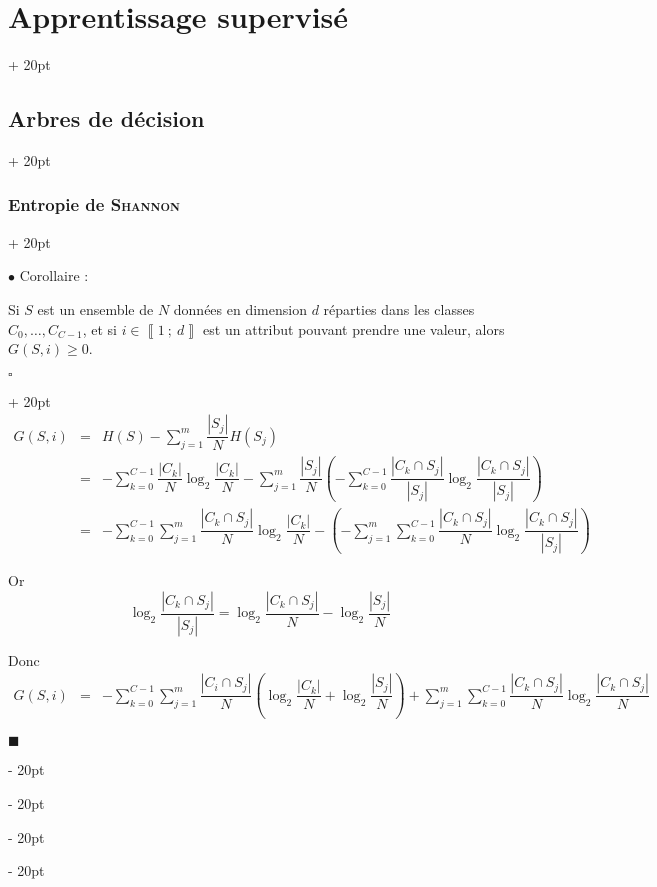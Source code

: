 \documentclass[a4paper, 12pt, twoside]{article}
\newcommand{\nset}[2]{\left\llbracket #1\ ;\ #2 \right\rrbracket}
\newcommand{\lr}[1]{\left( #1 \right)}
\newcommand{\abs}[1]{\left\lvert #1 \right\rvert}
\renewcommand{\ge}{\geqslant}
\newcommand{\ind}[1][20pt]{\advance\leftskip + #1}
\newcommand{\deind}[1][20pt]{\advance\leftskip - #1}
\newenvironment{indt}[2][20pt]{#2 \par \ind[#1]}{\par \deind} %
\newenvironment{proof}[1][{}]{\begin{indt}{$\square$ #1}}{$\blacksquare$ \end{indt}}
\begin{document}
\begin{indt}{\section{Apprentissage supervisé}}
\begin{indt}{\subsection{Arbres de décision}}
\begin{indt}{\subsubsection{Entropie de \textsc{Shannon}}}
                \vspace{12pt}
                
                $\bullet$ Corollaire :
                \begin{emphBox}
                    Si $S$ est un ensemble de $N$ données en dimension $d$ réparties dans les classes $C_0, \ldots, C_{C - 1}$, et si $i \in \nset 1 d$ est un attribut pouvant prendre une valeur, alors $G(S, i) \ge 0$.
                \end{emphBox}

                \vspace{6pt}
                
                \begin{proof}
                    \[
                        \begin{array}{rcl}
                            G(S, i)
                            &=& \displaystyle
                            H(S) - \sum_{j = 1}^m \dfrac{\abs{S_j}}{N} H(S_j)
                            \\
                            &=& \displaystyle
                            - \sum_{k = 0}^{C - 1} \dfrac{\abs{C_k}}{N} \log_2 \dfrac{\abs{C_k}}{N}
                            - \sum_{j = 1}^m \dfrac{\abs{S_j}}{N} \lr{
                                -\sum_{k = 0}^{C - 1} \dfrac{\abs{C_k \cap S_j}}{\abs{S_j}} \log_2 \dfrac{\abs{C_k \cap S_j}}{\abs{S_j}}
                            }
                            \\
                            &=& \displaystyle
                            -\sum_{k = 0}^{C - 1} \sum_{j = 1}^m \dfrac{\abs{C_k \cap S_j}}{N}\log_2 \dfrac{\abs{C_k}}{N}
                            - \lr{
                                -\sum_{j = 1}^m \sum_{k = 0}^{C - 1} \dfrac{\abs{C_k \cap S_j}}{N} \log_2 \dfrac{\abs{C_k \cap S_j}}{\abs{S_j}}
                            }
                        \end{array}
                    \]

                    Or
                    \[
                        \log_2 \dfrac{\abs{C_k \cap S_j}}{\abs{S_j}}
                        = \log_2 \dfrac{\abs{C_k \cap S_j}}{N}
                        - \log_2 \dfrac{\abs{S_j}}{N}
                    \]

                    Donc
                    \[
                        \begin{array}{rcl}
                            G(S, i)
                            &=&\displaystyle
                            - \sum_{k = 0}^{C - 1} \sum_{j = 1}^m \dfrac{\abs{C_i \cap S_j}}{N} \lr{\log_2 \dfrac{\abs{C_k}}{N} + \log_2 \dfrac{\abs{S_j}}{N}}
                            + \sum_{j = 1}^m \sum_{k = 0}^{C - 1} \dfrac{\abs{C_k \cap S_j}}{N} \log_2 \dfrac{\abs{C_k \cap S_j}}{N}
                        \end{array}
                    \]


\end{proof}
\end{indt}
\end{indt}
\end{indt}
\end{document}
